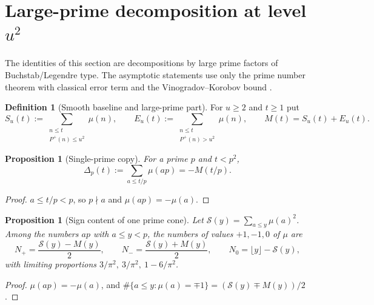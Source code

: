 \documentclass[11pt]{amsart}
\numberwithin{equation}{section}
\theoremstyle{plain}
\newtheorem{proposition}[theorem]{Proposition}
\theoremstyle{definition}
\newtheorem{definition}[theorem]{Definition}
\theoremstyle{remark}
\newcommand{\Pp}{P^{+}}
\newcommand{\Sq}{\mathcal{S}}
\begin{document}
\section{Large-prime decomposition at level \texorpdfstring{$u^2$}{u^2}}
\label{sec:prime_copy_propagation}

The identities of this section are decompositions by large prime factors of
Buchstab/Legendre type. The asymptotic statements use only the prime number
theorem with classical error term and the Vinogradov--Korobov bound
\cite{MontgomeryVaughan2007,Walfisz1963}.

\begin{definition}[Smooth baseline and large-prime part]
\label{def:baseline_channel}
For $u\ge2$ and $t\ge1$ put
\begin{equation}
\label{eq:baseline_channel_def}
  S_u(t):=\sum_{\substack{n\le t\\ \Pp(n)\le u^2}}\mu(n),\qquad
  E_u(t):=\sum_{\substack{n\le t\\ \Pp(n)>u^2}}\mu(n),\qquad
  M(t)=S_u(t)+E_u(t).
\end{equation}
\end{definition}

\begin{proposition}[Single-prime copy]
\label{prop:single_prime_copy}
For a prime $p$ and $t<p^2$,
\begin{equation}
\label{eq:single-prime-copy}
  \Delta_p(t):=\sum_{a\le t/p}\mu(ap)=-M(t/p).
\end{equation}
\end{proposition}

\begin{proof}
$a\le t/p<p$, so $p\nmid a$ and $\mu(ap)=-\mu(a)$.
\end{proof}

\begin{proposition}[Sign content of one prime cone]
\label{prop:prime-cone-signs}
Let $\Sq(y)=\sum_{a\le y}\mu(a)^2$. Among the numbers $ap$ with $a\le y<p$,
the numbers of values $+1,-1,0$ of $\mu$ are
\begin{equation}
\label{eq:cone_counts}
  N_+=\frac{\Sq(y)-M(y)}{2},\qquad N_-=\frac{\Sq(y)+M(y)}{2},\qquad
  N_0=\lfloor y\rfloor-\Sq(y),
\end{equation}
with limiting proportions $3/\pi^2,\ 3/\pi^2,\ 1-6/\pi^2$.
\end{proposition}

\begin{proof}
$\mu(ap)=-\mu(a)$, and $\#\{a\le y:\mu(a)=\mp1\}=(\Sq(y)\mp M(y))/2$.
\end{proof}
\end{document}
